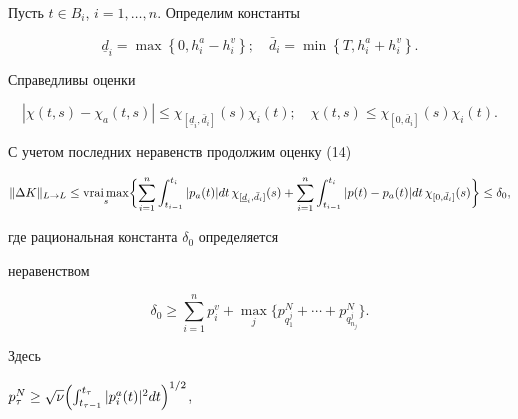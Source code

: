 Пусть $t \in B_i$, $i=1,\dotsc, n$. Определим константы


%


$$


{\underline d}_i = \max \left\{ 0, h_i^a -h_i^v \right\}; \quad


\bar d_i = \min \left\{ T, h_i^a +h_i^v \right\}.


$$


%


Справедливы оценки


%


$$


|\chi (t,s) - \chi_a(t,s) | \le \chi _{[{\underline d}_i, \bar d_i]} (s)


 \chi _i(t); \quad


\chi (t,s) \le \chi _{[0, \bar d_i]} (s)  \chi _i(t).


$$





С учетом последних неравенств продолжим оценку (14)


%


$$


\| \Delta K \| _{L \to L}


\le \vraimax_s \biggl\{ \sum_{i=1}^n


\int_{t_{i-1}}^{t_i}


| p_a(t)| dt\, \chi _{[{\underline d}_i, \bar d_i]}(s) +


\sum_{i=1}^n


\int_{t_{i-1}}^{t_i} | p(t) - p_a(t) | dt\,


\chi _{[0, \bar d_i]}(s)\biggr\} \le \delta_0,


$$


%


где рациональная константа $\delta_0$ определяется


неравенством


%


\begin{equation}


\delta_0 \ge \sum_{i=1}^n p^v_i + \max_j


\bigl\{ p^N_{q^j_1}+\dotsb+p^N_{q^j_{n_j}} \bigr\}.


\end{equation}


%


Здесь


$p_{\tau}^N \ge \sqrt{\nu} \Bigl(


\int_{t_{\tau-1}}^{t_{\tau}} |p_i^a (t)|^2 dt \Bigr)^{1/2}$,


